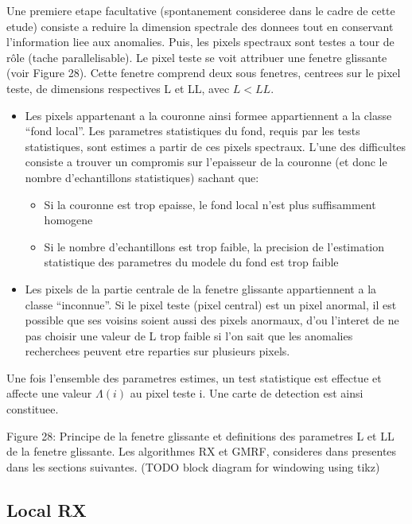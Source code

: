 Une premiere etape facultative (spontanement consideree dans le cadre
de cette etude) consiste a reduire la dimension spectrale des donnees
tout en conservant l'information liee aux anomalies. Puis, les pixels
spectraux sont testes a tour de rôle (tache parallelisable). Le pixel
teste se voit attribuer une fenetre glissante (voir Figure 28). Cette
fenetre comprend deux sous fenetres, centrees sur le pixel teste, de
dimensions respectives L et LL, avec $L < LL$. 
\begin{itemize}
\item Les pixels appartenant a la couronne ainsi formee appartiennent
  a la classe ``fond local''. Les parametres statistiques du fond,
  requis par les tests statistiques, sont estimes a partir de ces
  pixels spectraux. L'une des difficultes consiste a trouver un
  compromis sur l'epaisseur de la couronne (et donc le nombre
  d'echantillons statistiques) sachant que: 
\begin{itemize}
\item Si la couronne est trop epaisse, le fond local n'est plus
  suffisamment homogene 
\item Si le nombre d'echantillons est trop faible, la precision de
  l'estimation statistique des parametres du modele du fond est trop
  faible
\end{itemize}  
\item Les pixels de la partie centrale de la fenetre glissante
  appartiennent a la classe ``inconnue''. Si le pixel teste (pixel
  central) est un pixel anormal, il est possible que ses voisins
  soient aussi des pixels anormaux, d'ou l'interet de ne pas choisir
  une valeur de L trop faible si l'on sait que les anomalies
  recherchees peuvent etre reparties sur plusieurs pixels.
\end{itemize}  
Une fois l'ensemble des
parametres estimes, un test statistique est effectue et affecte une
valeur $\Lambda(i)$ au pixel teste i. Une carte de detection est ainsi
constituee.

Figure 28: Principe de la fenetre glissante et definitions des
parametres L et LL de la fenetre glissante.  Les algorithmes RX et
GMRF, consideres dans presentes dans les sections suivantes.
(TODO  block diagram for windowing using tikz)

\subsection{Local RX}
